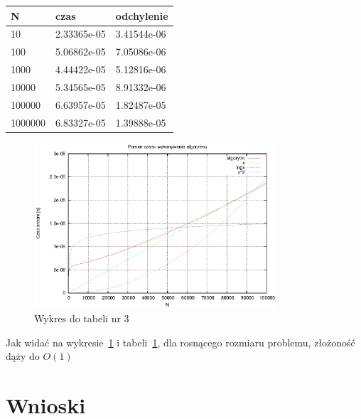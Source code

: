 \documentclass[a4paper,11pt]{article}
\begin{document}
\begin{enumerate}
\begin{table}[th]
      \begin{tabular}{|l|l|l|}
	\hline
	N & czas & odchylenie \\
    \hline
  10 & 2.33365e-05 &  3.41544e-06\\
  \hline
100 & 5.06862e-05 &  7.05086e-06\\
\hline
1000 & 4.44422e-05 &  5.12816e-06\\
\hline
10000 & 5.34565e-05 &  8.91332e-06\\
\hline
100000 & 6.63957e-05 &  1.82487e-05\\
\hline
1000000 & 6.83327e-05 &  1.39888e-05\\
\hline
    \end{tabular}
    \label{tab3}
    \end{table}
    \newpage
\begin{figure}[th]
\centering
\includegraphics[width=0.8\textwidth]{../prj/wykres11.eps}
\caption{Wykres do tabeli nr 3}
\label{Wykres3}
\end{figure} 
Jak widać na wykresie~\ref{Wykres3} i tabeli~\ref{tab3}, dla rosnącego rozmiaru problemu, złożoność dąży do $ O(1) $
\end{enumerate}

\section{Wnioski}
\end{document}
